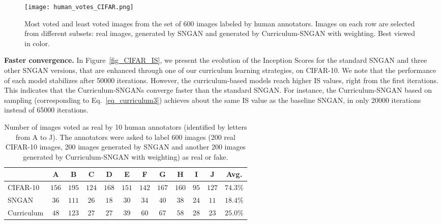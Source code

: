 \documentclass[10pt,twocolumn,letterpaper]{article}
\begin{document}
\begin{figure*}[!t]
\begin{center}
\texttt{[image: human\_votes\_CIFAR.png]}
\end{center}
\vspace*{-0.4cm}
\caption{Most voted and least voted images from the set of 600 images labeled by human annotators. Images on each row are selected from different subsets: real images, generated by SNGAN and generated by Curriculum-SNGAN with weighting. Best viewed in color.}
\label{fig_CIFAR_voted}
\vspace*{-0.4cm}
\end{figure*}

\noindent
{\bf Faster convergence.}
In Figure~\ref{fig_CIFAR_IS}, we present the evolution of the Inception Scores for the standard SNGAN and three other SNGAN versions, that are enhanced through one of our curriculum learning strategies, on CIFAR-10. We note that the performance of each model stabilizes after 50000 iterations. However, the curriculum-based models reach higher IS values, right from the first iterations. This indicates that the Curriculum-SNGANs converge faster than the standard SNGAN. For instance, the Curriculum-SNGAN based on sampling (corresponding to Eq.~\eqref{eq_curriculum3}) achieves about the same IS value as the baseline SNGAN, in only 20000 iterations instead of 65000 iterations.

\begin{table}[t]
\setlength\tabcolsep{1.2pt}
\small{
\begin{center}
\begin{tabular}{|l|c|c|c|c|c|c|c|c|c|c|c|}
\hline
                & A & B & C & D & E & F & G & H & I & J & Avg. \\
\hline
\hline
CIFAR-10        & $156$ & $195$ & $124$ & $168$ & $151$ & $142$ & $167$ & $160$ & $95$  & $127$ & $74.3\%$ \\
\hline
SNGAN~\cite{Miyato-ICLR-2018}   & $36$  & $111$ & $26$  & $18$  & $30$  & $34$  & $40$  & $38$  & $24$  & $11$  & $18.4\%$ \\
\hline
Curriculum      & $48$  & $123$ & $27$  & $27$  & $39$  & $60$  & $67$  & $58$  & $28$  & $23$  & $25.0\%$ \\
\hline
\end{tabular}
\end{center}
\vspace*{-0.15cm}
\caption{Number of images voted as real by 10 human annotators (identified by letters from A to J). The annotators were asked to label 600 images (200 real CIFAR-10 images, 200 images generated by SNGAN and another 200 images generated by Curriculum-SNGAN with weighting) as real or fake.\label{tab_results_human_CIFAR}}
}
\vspace*{-0.4cm}
\end{table}
\end{document}
